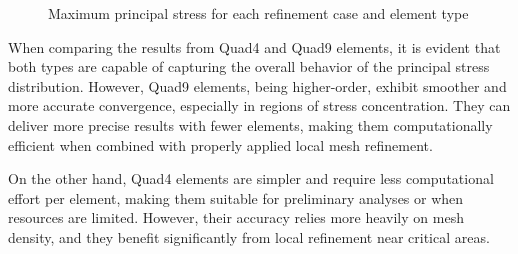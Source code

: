 \documentclass[12pt]{article}
\begin{document}
\begin{figure}[H]
    \centering
    \caption{Maximum principal stress for each refinement case and element type}
    \label{fig:max_stress_comparison}
\end{figure}

When comparing the results from Quad4 and Quad9 elements, it is evident that both types are capable of capturing the overall behavior of the principal stress distribution. However, Quad9 elements, being higher-order, exhibit smoother and more accurate convergence, especially in regions of stress concentration. They can deliver more precise results with fewer elements, making them computationally efficient when combined with properly applied local mesh refinement.

On the other hand, Quad4 elements are simpler and require less computational effort per element, making them suitable for preliminary analyses or when resources are limited. However, their accuracy relies more heavily on mesh density, and they benefit significantly from local refinement near critical areas.
\end{document}
